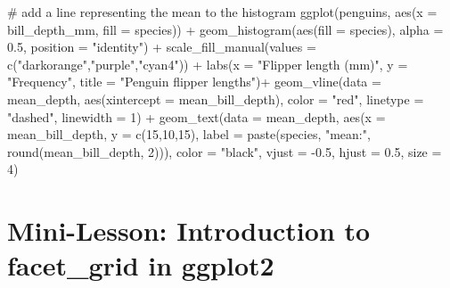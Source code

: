 \documentclass[
  letterpaper,
  DIV=11,
  numbers=noendperiod]{scrreprt}
\newenvironment{Shaded}{\begin{snugshade}}{\end{snugshade}}
\newcommand{\AttributeTok}[1]{\textcolor[rgb]{0.40,0.45,0.13}{#1}}
\newcommand{\CommentTok}[1]{\textcolor[rgb]{0.37,0.37,0.37}{#1}}
\newcommand{\DecValTok}[1]{\textcolor[rgb]{0.68,0.00,0.00}{#1}}
\newcommand{\FloatTok}[1]{\textcolor[rgb]{0.68,0.00,0.00}{#1}}
\newcommand{\FunctionTok}[1]{\textcolor[rgb]{0.28,0.35,0.67}{#1}}
\newcommand{\NormalTok}[1]{\textcolor[rgb]{0.00,0.23,0.31}{#1}}
\newcommand{\SpecialCharTok}[1]{\textcolor[rgb]{0.37,0.37,0.37}{#1}}
\newcommand{\StringTok}[1]{\textcolor[rgb]{0.13,0.47,0.30}{#1}}
\begin{document}
\begin{tcolorbox}
\begin{Shaded}
\begin{Highlighting}[]
\CommentTok{\# add a line representing the mean to the histogram}
\FunctionTok{ggplot}\NormalTok{(penguins, }\FunctionTok{aes}\NormalTok{(}\AttributeTok{x =}\NormalTok{ bill\_depth\_mm, }\AttributeTok{fill =}\NormalTok{ species)) }\SpecialCharTok{+}
  \FunctionTok{geom\_histogram}\NormalTok{(}\FunctionTok{aes}\NormalTok{(}\AttributeTok{fill =}\NormalTok{ species), }\AttributeTok{alpha =} \FloatTok{0.5}\NormalTok{, }\AttributeTok{position =} \StringTok{"identity"}\NormalTok{) }\SpecialCharTok{+}
  \FunctionTok{scale\_fill\_manual}\NormalTok{(}\AttributeTok{values =} \FunctionTok{c}\NormalTok{(}\StringTok{"darkorange"}\NormalTok{,}\StringTok{"purple"}\NormalTok{,}\StringTok{"cyan4"}\NormalTok{)) }\SpecialCharTok{+}
  \FunctionTok{labs}\NormalTok{(}\AttributeTok{x =} \StringTok{"Flipper length (mm)"}\NormalTok{,}
     \AttributeTok{y =} \StringTok{"Frequency"}\NormalTok{,}
     \AttributeTok{title =} \StringTok{"Penguin flipper lengths"}\NormalTok{)}\SpecialCharTok{+}
  \FunctionTok{geom\_vline}\NormalTok{(}\AttributeTok{data =}\NormalTok{ mean\_depth, }\FunctionTok{aes}\NormalTok{(}\AttributeTok{xintercept =}\NormalTok{ mean\_bill\_depth),}
     \AttributeTok{color =} \StringTok{"red"}\NormalTok{, }\AttributeTok{linetype =} \StringTok{"dashed"}\NormalTok{, }\AttributeTok{linewidth =} \DecValTok{1}\NormalTok{) }\SpecialCharTok{+}
  \FunctionTok{geom\_text}\NormalTok{(}\AttributeTok{data =}\NormalTok{ mean\_depth, }\FunctionTok{aes}\NormalTok{(}\AttributeTok{x =}\NormalTok{ mean\_bill\_depth, }\AttributeTok{y =} \FunctionTok{c}\NormalTok{(}\DecValTok{15}\NormalTok{,}\DecValTok{10}\NormalTok{,}\DecValTok{15}\NormalTok{),}
     \AttributeTok{label =} \FunctionTok{paste}\NormalTok{(species, }\StringTok{"mean:"}\NormalTok{, }\FunctionTok{round}\NormalTok{(mean\_bill\_depth, }\DecValTok{2}\NormalTok{))),}
     \AttributeTok{color =} \StringTok{"black"}\NormalTok{, }\AttributeTok{vjust =} \SpecialCharTok{{-}}\FloatTok{0.5}\NormalTok{, }
     \AttributeTok{hjust =} \FloatTok{0.5}\NormalTok{, }\AttributeTok{size =} \DecValTok{4}\NormalTok{) }
\end{Highlighting}
\end{Shaded}

\end{tcolorbox}

\hypertarget{mini-lesson-introduction-to-facet_grid-in-ggplot2}{%
\section{Mini-Lesson: Introduction to facet\_grid in
ggplot2}\label{mini-lesson-introduction-to-facet_grid-in-ggplot2}}
\end{document}
